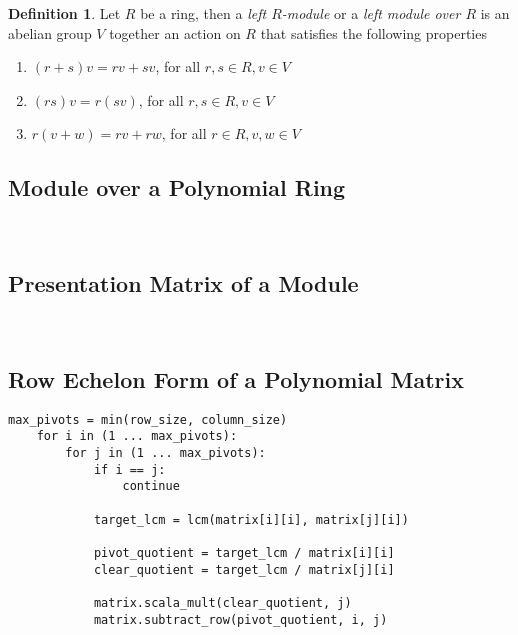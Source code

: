 \documentclass{amsart}
\theoremstyle{definition}
\newtheorem{definition}[theorem]{Definition}
\theoremstyle{remark}
\numberwithin{equation}{section}
\begin{document}
\begin{definition}
  Let $R$ be a ring, then a \emph{left $R$-module} or a \emph{left module over $R$} is an abelian group $V$ together an action on $R$ that satisfies the following properties
  \begin{enumerate}[i]
  \item $(r + s)v = rv + sv$, for all $r, s \in R, v \in V$
  \item $(rs)v = r(sv)$, for all $r, s \in R, v \in V$
  \item $r(v + w) = rv + rw$, for all $r \in R, v, w \in V$
  \end{enumerate}
\end{definition}

\subsection{Module over a Polynomial Ring}

\leavevmode \\


\subsection{Presentation Matrix of a Module}

\leavevmode \\


\subsection{Row Echelon Form of a Polynomial Matrix}

\begin{lstlisting}[caption=Computing the Row Echelon Form of a Polynomial Matrix]
    max_pivots = min(row_size, column_size)
    for i in (1 ... max_pivots):
        for j in (1 ... max_pivots):
            if i == j:
                continue

            target_lcm = lcm(matrix[i][i], matrix[j][i])
    
            pivot_quotient = target_lcm / matrix[i][i]
            clear_quotient = target_lcm / matrix[j][i]
    
            matrix.scala_mult(clear_quotient, j)
            matrix.subtract_row(pivot_quotient, i, j)
\end{lstlisting}
\end{document}
